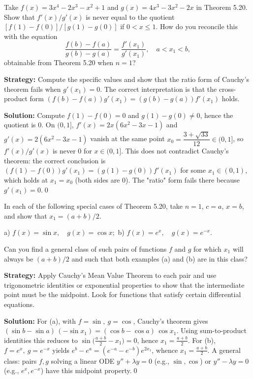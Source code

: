 \begin{problembox}
Take \( f(x) = 3x^4 - 2x^3 - x^2 + 1 \) and \( g(x) = 4x^3 - 3x^2 - 2x \) in Theorem 5.20. Show that \( f'(x)/g'(x) \) is never equal to the quotient \( [f(1) - f(0)]/[g(1) - g(0)] \) if \( 0 < x \leq 1 \). How do you reconcile this with the equation
\[ \frac{f(b) - f(a)}{g(b) - g(a)} = \frac{f'(x_1)}{g'(x_1)}, \quad a < x_1 < b, \]
obtainable from Theorem 5.20 when \( n = 1 \)?
\end{problembox}

\noindent\textbf{Strategy:} Compute the specific values and show that the ratio form of Cauchy's theorem fails when \( g'(x_1) = 0 \). The correct interpretation is that the cross-product form \( (f(b) - f(a))g'(x_1) = (g(b) - g(a))f'(x_1) \) holds.

\bigskip\noindent\textbf{Solution:}
Compute $f(1)-f(0)=0$ and $g(1)-g(0)\ne 0$, hence the quotient is $0$. On $(0,1]$, $f'(x)=2x(6x^2-3x-1)$ and $g'(x)=2(6x^2-3x-1)$ vanish at the same point $x_0=\dfrac{3+\sqrt{33}}{12}\in(0,1]$, so $f'(x)/g'(x)$ is never $0$ for $x\in(0,1]$. This does not contradict Cauchy's theorem: the correct conclusion is $(f(1)-f(0))g'(x_1)=(g(1)-g(0))f'(x_1)$ for some $x_1\in(0,1)$, which holds at $x_1=x_0$ (both sides are $0$). The "ratio" form fails there because $g'(x_1)=0$.\qed


\begin{problembox}
In each of the following special cases of Theorem 5.20, take \( n = 1 \), \( c = a \), \( x = b \), and show that \( x_1 = (a + b)/2 \).

a) \( f(x) = \sin x, \quad g(x) = \cos x; \) 
b) \( f(x) = e^x, \quad g(x) = e^{-x} \).

Can you find a general class of such pairs of functions \( f \) and \( g \) for which \( x_1 \) will always be \( (a + b)/2 \) and such that both examples (a) and (b) are in this class?
\end{problembox}

\noindent\textbf{Strategy:} Apply Cauchy's Mean Value Theorem to each pair and use trigonometric identities or exponential properties to show that the intermediate point must be the midpoint. Look for functions that satisfy certain differential equations.

\bigskip\noindent\textbf{Solution:}
For (a), with $f=\sin,\ g=\cos$, Cauchy's theorem gives $(\sin b-\sin a)\,(-\sin x_1)=(\cos b-\cos a)\,\cos x_1$. Using sum-to-product identities this reduces to $\sin\big(\tfrac{a+b}{2}-x_1\big)=0$, hence $x_1=\tfrac{a+b}{2}$. For (b), $f=e^x,\ g=e^{-x}$ yields $e^b-e^a=(e^{-a}-e^{-b})e^{2x_1}$, whence $x_1=\tfrac{a+b}{2}$. A general class: pairs $f,g$ solving a linear ODE $y''+\lambda y=0$ (e.g., $\sin,\cos$) or $y''-\lambda y=0$ (e.g., $e^x,e^{-x}$) have this midpoint property.\qed



